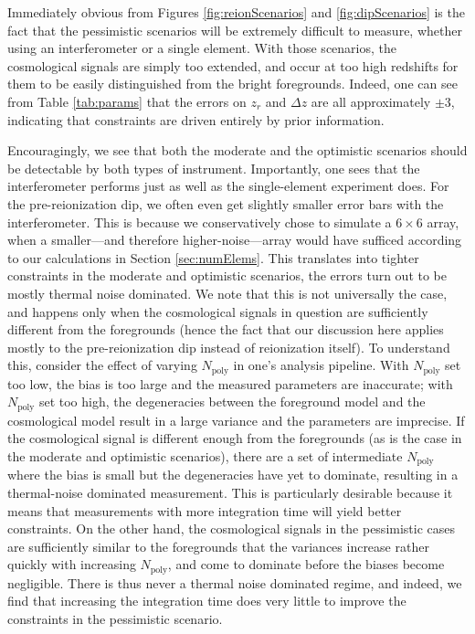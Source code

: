 \documentclass[twocolumn,apj,numberedappendix]{emulateapj}
\newcommand{\acl}[1]{}
\newcommand{\mep}[1]{}
\begin{document}
Immediately obvious from Figures \ref{fig:reionScenarios} and \ref{fig:dipScenarios} is the fact that the pessimistic scenarios will be extremely difficult to measure, whether using an interferometer or a single element. With those scenarios, the cosmological signals are simply too extended, and occur at too high redshifts for them to be easily distinguished from the bright foregrounds. Indeed, one can see from Table \ref{tab:params} that the errors on $z_r$ and $\Delta z$ are all approximately $\pm 3$, indicating that constraints are driven entirely by prior information.

\acl{softened claims a little} Encouragingly, we see that both the moderate and the optimistic scenarios should be detectable by both types of instrument. Importantly, one sees that the interferometer performs just as well as the single-element experiment does. For the pre-reionization dip, we often even get slightly smaller error bars with the interferometer. This is because we conservatively chose to simulate a $6\times 6$ array, when a smaller---and therefore higher-noise---array would have sufficed according to our calculations in Section \ref{sec:numElems}. This translates into tighter constraints in the moderate and optimistic scenarios, the errors turn out to be mostly thermal noise dominated. We note that this is not universally the case, and happens only when the cosmological signals in question are sufficiently different from the foregrounds (hence the fact that our discussion here applies mostly to the pre-reionization dip instead of reionization itself). To understand this, consider the effect of varying $N_\textrm{poly}$ in one's analysis pipeline. With $N_\textrm{poly}$ set too low, the bias is too large and the measured parameters are inaccurate; with $N_\textrm{poly}$ set too high, the degeneracies between the foreground model and the cosmological model result in a large variance and the parameters are imprecise. If the cosmological signal is different enough from the foregrounds (as is the case in the moderate and optimistic scenarios), there are a set of intermediate $N_\textrm{poly}$ where the bias is small but the degeneracies have yet to dominate, resulting in a thermal-noise dominated measurement. This is particularly desirable because it means that measurements with more integration time will yield better constraints. \mep{fixed sentence per reviewer comment} On the other hand, the cosmological signals in the pessimistic cases are sufficiently similar to the foregrounds that the variances increase rather quickly with increasing $N_\textrm{poly}$, and come to dominate before the biases become negligible. There is thus never a thermal noise dominated regime, and indeed, we find that increasing the integration time does very little to improve the constraints in the pessimistic scenario.
\end{document}

